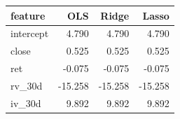 \begin{tabular}{lrrr}
\toprule
feature & OLS & Ridge & Lasso \\
\midrule
intercept & 4.790 & 4.790 & 4.790 \\
close & 0.525 & 0.525 & 0.525 \\
ret & -0.075 & -0.075 & -0.075 \\
rv_30d & -15.258 & -15.258 & -15.258 \\
iv_30d & 9.892 & 9.892 & 9.892 \\
\bottomrule
\end{tabular}

